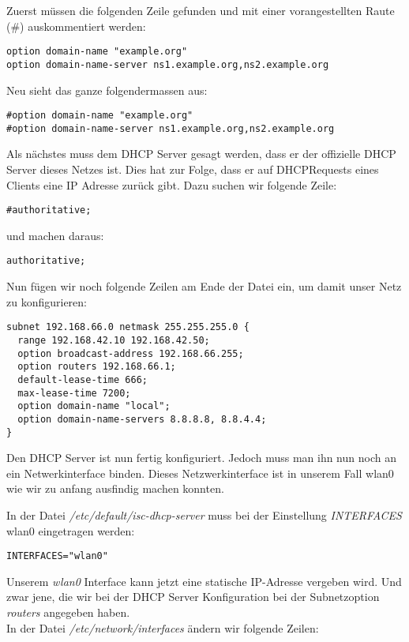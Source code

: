 Zuerst müssen die folgenden Zeile gefunden und mit einer vorangestellten Raute (\#) auskommentiert werden:

\begin{lstlisting}
option domain-name "example.org"
option domain-name-server ns1.example.org,ns2.example.org
\end{lstlisting}

Neu sieht das ganze folgendermassen aus:

\begin{lstlisting}
#option domain-name "example.org"
#option domain-name-server ns1.example.org,ns2.example.org
\end{lstlisting}

Als nächstes muss dem DHCP Server gesagt werden, dass er der offizielle DHCP Server dieses Netzes ist. Dies hat zur Folge, dass er auf DHCPRequests eines Clients eine IP Adresse zurück gibt.
Dazu suchen wir folgende Zeile:

\begin{lstlisting}
#authoritative;
\end{lstlisting}

und machen daraus:

\begin{lstlisting}
authoritative;
\end{lstlisting}

Nun fügen wir noch folgende Zeilen am Ende der Datei ein, um damit unser Netz zu konfigurieren:

\begin{lstlisting}
subnet 192.168.66.0 netmask 255.255.255.0 {
  range 192.168.42.10 192.168.42.50;
  option broadcast-address 192.168.66.255;
  option routers 192.168.66.1;
  default-lease-time 666;
  max-lease-time 7200;
  option domain-name "local";
  option domain-name-servers 8.8.8.8, 8.8.4.4;
}
\end{lstlisting}

Den DHCP Server ist nun fertig konfiguriert. Jedoch muss man ihn nun noch an ein Netwerkinterface binden. Dieses Netzwerkinterface ist in unserem Fall wlan0 wie wir zu anfang ausfindig machen konnten.

In der Datei \textit{/etc/default/isc-dhcp-server} muss bei der Einstellung \textit{INTERFACES} wlan0 eingetragen werden:

\begin{lstlisting}
INTERFACES="wlan0"
\end{lstlisting}

Unserem \textit{wlan0} Interface kann jetzt eine statische IP-Adresse vergeben wird. Und zwar jene, die wir bei der DHCP Server Konfiguration bei der Subnetzoption \textit{routers} angegeben haben. \\
In der Datei \textit{/etc/network/interfaces} ändern wir folgende Zeilen:

